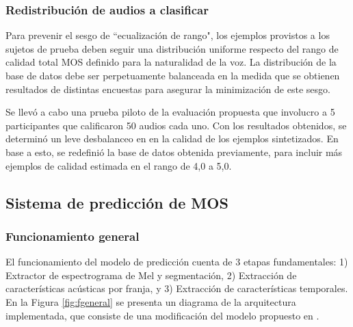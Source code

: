 \subsubsection{Redistribución de audios a clasificar}

Para prevenir el sesgo de “ecualización de rango", los ejemplos provistos a los sujetos de prueba deben seguir una distribución uniforme respecto del rango de calidad total MOS definido para la naturalidad de la voz. La distribución de la base de datos debe ser perpetuamente balanceada en la medida que se obtienen resultados de distintas encuestas para asegurar la minimización de este sesgo.

Se llevó a cabo una prueba piloto de la evaluación propuesta que involucro a 5 participantes que calificaron 50 audios cada uno. Con los resultados obtenidos, se determinó un leve desbalanceo en en la calidad de los ejemplos sintetizados. En base a esto, se redefinió la base de datos obtenida previamente, para incluir más ejemplos de calidad estimada en el rango de 4,0 a 5,0. 


\subsection{Sistema de predicción de MOS}

\subsubsection{Funcionamiento general}
El funcionamiento del modelo de predicción cuenta de 3 etapas fundamentales: 1) Extractor de espectrograma de Mel y segmentación, 2) Extracción de características acústicas por franja, y 3) Extracción de características temporales. En la Figura \eqref{fig:fgeneral} se presenta un diagrama de la arquitectura implementada, que consiste de una modificación del modelo propuesto en \cite{qualityEst}.


